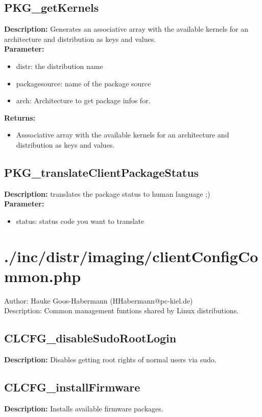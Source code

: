 \subsection{PKG\_getKernels}
\textbf{Description:} Generates an associative array with the available kernels for an architecture and distribution as keys and values.\\
\textbf{Parameter:}
\begin{itemize}
\item distr: the distribution name
\item packagesource: name of the package source
\item arch: Architecture to get package infos for.
\end{itemize}
\textbf{Returns:}
\begin{itemize}
\item Asssociative array with the available kernels for an architecture and distribution as keys and values.
\end{itemize}

\subsection{PKG\_translateClientPackageStatus}
\textbf{Description:} translates the package status to human language ;)\\
\textbf{Parameter:}
\begin{itemize}
\item status: status code you want to translate
\end{itemize}

\newpage\section{./inc/distr/imaging/clientConfigCommon.php}
 Author: Hauke Goos-Habermann (HHabermann@pc-kiel.de)\\
 Description: Common management funtions shared by Linux distributions.\\

\subsection{CLCFG\_disableSudoRootLogin}
\textbf{Description:} Disables getting root rights of normal users via sudo.\\

\subsection{CLCFG\_installFirmware}
\textbf{Description:} Installs available firmware packages.\\

